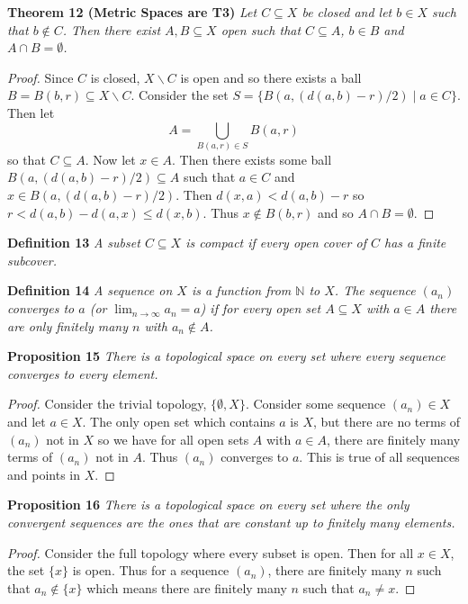 \documentclass{article}
\begin{document}
\begin{flushleft}
\textbf{Theorem 12 (Metric Spaces are T3)}
\textsl{Let $C \subseteq X$ be closed and let $b \in X$ such that $b \notin C$. Then there exist $A, B \subseteq X$ open such that $C \subseteq A$, $b \in B$ and $A \cap B = \emptyset$.}
\begin{proof}
Since $C$ is closed, $X \backslash C$ is open and so there exists a ball $B = B(b, r) \subseteq X \backslash C$. Consider the set $S = \{B(a, (d(a,b)-r)/2) \mid a \in C\}$. Then let
\[
A = \bigcup_{B(a,r) \in S} B(a,r)
\]
so that $C \subseteq A$. Now let $x \in A$. Then there exists some ball $B(a, (d(a,b)-r)/2) \subseteq A$ such that $a \in C$ and $x \in B(a, (d(a,b)-r)/2)$. Then $d(x,a) < d(a,b)-r$ so $r < d(a,b) - d(a,x) \leq d(x,b)$. Thus $x \notin B(b,r)$ and so $A \cap B = \emptyset$.
\end{proof}

\textbf{Definition 13}
\textsl{A subset $C \subseteq X$ is compact if every open cover of $C$ has a finite subcover.}\newline

\textbf{Definition 14}
\textsl{A sequence on $X$ is a function from $\mathbb{N}$ to $X$. The sequence $(a_n)$ converges to $a$ (or $\lim_{n \rightarrow \infty} a_n = a$) if for every open set $A \subseteq X$ with $a \in A$ there are only finitely many $n$ with $a_n \notin A$.}\newline

\textbf{Proposition 15}
\textsl{There is a topological space on every set where every sequence converges to every element.}
\begin{proof}
Consider the trivial topology, $\{\emptyset, X\}$. Consider some sequence $(a_n) \in X$ and let $a \in X$. The only open set which contains $a$ is $X$, but there are no terms of $(a_n)$ not in $X$ so we have for all open sets $A$ with $a \in A$, there are finitely many terms of $(a_n)$ not in $A$. Thus $(a_n)$ converges to $a$. This is true of all sequences and points in $X$.
\end{proof}

\textbf{Proposition 16}
\textsl{There is a topological space on every set where the only convergent sequences are the ones that are constant up to finitely many elements.}
\begin{proof}
Consider the full topology where every subset is open. Then for all $x \in X$, the set $\{x\}$ is open. Thus for a sequence $(a_n)$, there are finitely many $n$ such that $a_n \notin \{x\}$ which means there are finitely many $n$ such that $a_n \neq x$.
\end{proof}


\end{flushleft}
\end{document}
